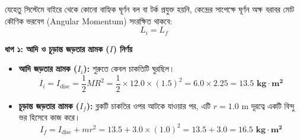 \documentclass[12pt, a4paper]{article}
\begin{document}
\begin{tcolorbox}[solutionbox={সমাধান (Solution)}]
\noindent
যেহেতু সিস্টেমে বাইরে থেকে কোনো বাহ্যিক ঘূর্ণন বল বা টর্ক প্রযুক্ত হয়নি, কেন্দ্রের সাপেক্ষে ঘূর্ণন অক্ষ বরাবর মোট কৌণিক ভরবেগ (Angular Momentum) সংরক্ষিত থাকবে:
$$L_i = L_f$$

\vspace{0.5em}
\noindent
\textbf{ধাপ ১: আদি ও চূড়ান্ত জড়তার ভ্রামক ($I$) নির্ণয়} \\
\begin{itemize}[leftmargin=*, parsep=0.4ex]
    \item \textbf{আদি জড়তার ভ্রামক ($I_i$):} শুরুতে কেবল চাকতিটি ঘুরছিল।
    $$I_i = I_{\text{disc}} = \frac{1}{2} M R^2 = \frac{1}{2} \times 12.0 \times (1.5)^2 = 6.0 \times 2.25 = \mathbf{13.5\text{ kg}\cdot\text{m}^2}$$
    
    \item \textbf{চূড়ান্ত জড়তার ভ্রামক ($I_f$):} ব্লকটি চাকতির ওপর আটকে যাওয়ার পর, এটি $r = 1.0\text{ m}$ দূরত্বে একটি বিন্দু ভর হিসেবে কাজ করে।
    $$I_f = I_{\text{disc}} + m r^2 = 13.5 + 3.0 \times (1.0)^2 = 13.5 + 3.0 = \mathbf{16.5\text{ kg}\cdot\text{m}^2}$$
\end{itemize}

\vspace{1em}
\begin{center}
\end{center}
\end{tcolorbox}
\end{document}

